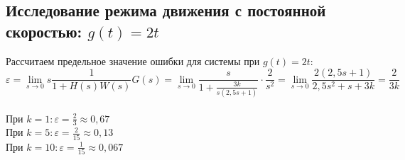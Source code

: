 \documentclass[a4paper, 11pt, russian]{article}
\begin{document}
    \subsection{Исследование режима движения с постоянной скоростью: $g(t) = 2t$}
    Рассчитаем предельное значение ошибки для системы при $g(t) = 2t$: $$\varepsilon = \lim_{s\to0} s\frac{1}{1 + H(s)W(s)}G(s) = \lim_{s\to0} \frac{s}{1 + \frac{3k}{s(2,5s + 1)}}\cdot\frac{2}{s^2} = \lim_{s\to0} \frac{2(2,5s + 1)}{2,5s^2 + s + 3k} = \frac{2}{3k}$$\\
    При $k = 1: \varepsilon = \displaystyle{\frac{2}{3}} \approx 0,67$\\
    При $k = 5: \varepsilon = \displaystyle{\frac{2}{15}} \approx 0,13$\\
    При $k = 10: \varepsilon = \displaystyle{\frac{1}{15}} \approx 0,067$\\
    
\end{document}
